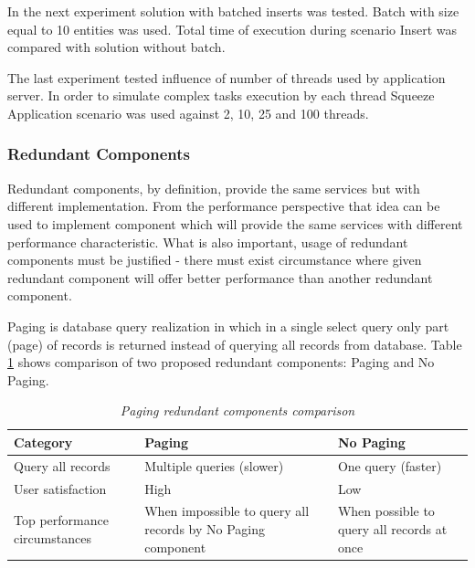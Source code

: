 \documentclass[12pt,a4paper]{article}
\begin{document}
In the next experiment solution with batched inserts was tested. Batch with size equal to 10 entities was used. Total time of execution during scenario Insert was compared with solution without batch. 

The last experiment tested influence of number of threads used by application server. In order to simulate complex tasks execution by each thread Squeeze Application scenario was used against 2, 10, 25 and 100 threads. 

\subsubsection{Redundant Components}
Redundant components, by definition, provide the same services but with different implementation. From the performance perspective that idea can be used to implement component which will provide the same services with different performance characteristic. What is also important, usage of redundant components must be justified - there must exist circumstance where given redundant component will offer better performance than another redundant component. 

Paging is database query realization in which in a single select query only part (page) of records is returned instead of querying all records from database. Table \ref{pagingcomponents} shows comparison of two proposed redundant components: Paging and No Paging.  
\begin{table}[!htb]
\def\arraystretch{1.5}
\caption{\textit{Paging redundant components comparison}}\label{pagingcomponents}
\begin{tabularx}{\textwidth}{p{3cm}|X|X}
  \textbf{Category} &\textbf{Paging} & \textbf{No Paging} \\
\hline
Query all records & Multiple queries (slower) & One query (faster) \\
User satisfaction & High & Low\\
Top performance circumstances & When impossible to query all records by No Paging component & When possible to query all records at once\\
\end{tabularx}
\end{table}
\end{document}
